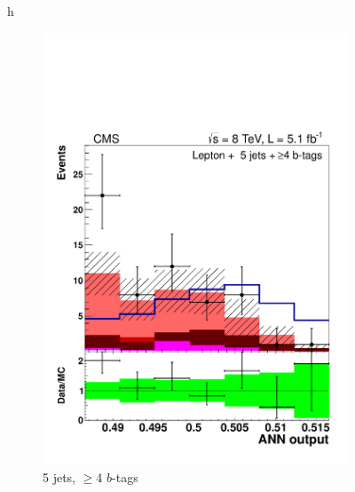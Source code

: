 \begin{figure}{h}
\begin{subfigure}[h]{0.31\textwidth}
        \includegraphics[width=\textwidth]{Figures/Analysis_1_Diagrams/d2MCPlots_CFMlpANN_cut8_j5_tge4_Combined_HtWgt.pdf}
        \caption{5 jets, $\ge$4 $b$-tags}\label{lj_ANNoutput_8TeV_6}
      \end{subfigure}
      ~ %
      \begin{subfigure}[h]{0.31\textwidth}

\end{subfigure}
\end{figure}
